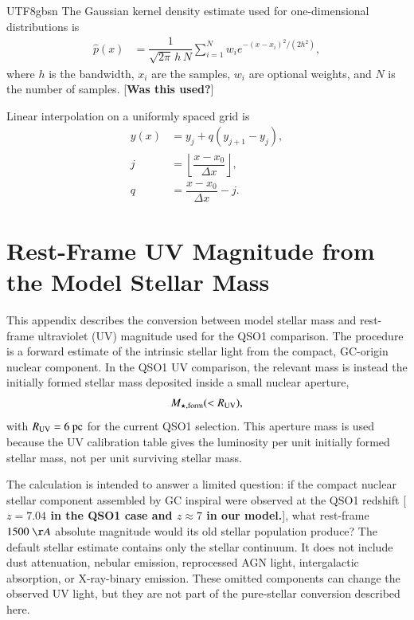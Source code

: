 \documentclass[trackchanges, twocolappendix, twocolumn]{aastex701}
\newcommand{\czkong}[1]{{\color{magenta}[\textbf{#1}]}}
\begin{document}
\begin{CJK*}{UTF8}{gbsn}
The Gaussian kernel density estimate used for one-dimensional distributions is
\begin{align}
\widehat{p}(x) &=
\dfrac{1}{\sqrt{2\pi}\,h\,N}
\sum_{i=1}^{N} w_i
e^{-(x-x_i)^2/(2h^2)},
\end{align}
where $h$ is the bandwidth, $x_i$ are the samples, $w_i$ are optional weights, and $N$ is the number of samples. \czkong{Was this used?}

Linear interpolation on a uniformly spaced grid is
\begin{align}
y(x) &= y_j + q(y_{j+1}-y_j),\\
j &= \left\lfloor \dfrac{x-x_0}{\Delta x}\right\rfloor,\\
q &= \dfrac{x-x_0}{\Delta x}-j.
\end{align}

\section{Rest-Frame UV Magnitude from the Model Stellar Mass}
\label{app:mstar_to_muv}

This appendix describes the conversion between model stellar mass and rest-frame ultraviolet (UV) magnitude used for the QSO1 comparison. The procedure is a forward estimate of the intrinsic stellar light from the compact, GC-origin nuclear component. In the QSO1 UV comparison, the relevant mass is instead the initially formed stellar mass deposited inside a small nuclear aperture,
\begin{align}
M_{\star,{\rm form}}(<R_{\rm UV}),
\end{align}
with $R_{\rm UV}=6~{\rm pc}$ for the current QSO1 selection. This aperture mass is used because the UV calibration table gives the luminosity per unit initially formed stellar mass, not per unit surviving stellar mass.

The calculation is intended to answer a limited question: if the compact nuclear stellar component assembled by GC inspiral were observed at the QSO1 redshift \czkong{$z = 7.04$ in the QSO1 case and $z \approx 7$ in our model.}, what rest-frame $1500~\AA$ absolute magnitude would its old stellar population produce? The default stellar estimate contains only the stellar continuum. It does not include dust attenuation, nebular emission, reprocessed AGN light, intergalactic absorption, or X-ray-binary emission. These omitted components can change the observed UV light, but they are not part of the pure-stellar conversion described here.


\end{CJK*}
\end{document}
